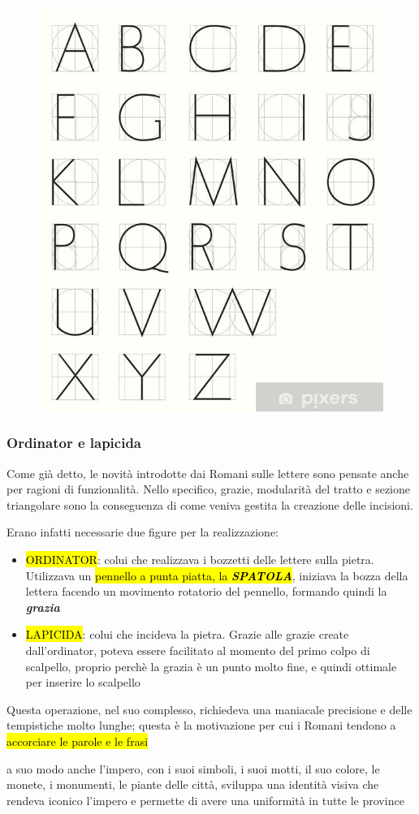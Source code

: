     \begin{figure}[H]
    \centering
    \includegraphics[width=0.4\linewidth]{lezione_3/imgs/carte-da-parati-capitali-romane-monoline-con-griglia-geometrica.jpg.jpg}
\end{figure}
    \subsubsection{Ordinator e lapicida}
    Come già detto, le novità introdotte dai Romani sulle lettere sono pensate anche per ragioni di funzionalità.
    Nello specifico, grazie, modularità del tratto e sezione triangolare sono la conseguenza di come veniva gestita la creazione delle incisioni.

    Erano infatti necessarie due figure per la realizzazione:
    \begin{itemize}
        \item \hl{ORDINATOR}: colui che realizzava i bozzetti delle lettere sulla pietra. Utilizzava un \hl{pennello a punta piatta, la \textbf{\textit{SPATOLA}}}, iniziava la bozza della lettera facendo un movimento rotatorio del pennello, formando quindi la \textbf{\textit{grazia}}
        \item  \hl{LAPICIDA}: colui che incideva la pietra. Grazie alle grazie create dall'ordinator, poteva essere facilitato al momento del primo colpo di scalpello, proprio perchè la grazia è un punto molto fine, e quindi ottimale per inserire lo scalpello
    \end{itemize}

    Questa operazione, nel suo complesso, richiedeva una maniacale precisione e delle tempistiche molto lunghe; questa è la motivazione per cui i Romani tendono a \hl{accorciare le parole e le frasi}
    

\begin{mdframed}[style=mystyle,frametitle=Roma come i moderni brand]
     a suo modo anche l'impero, con i suoi simboli, i suoi motti, il suo colore, le monete, i monumenti, le piante delle città, sviluppa una identità visiva che rendeva iconico l'impero e permette di avere una uniformità in tutte le province
    \end{mdframed}

